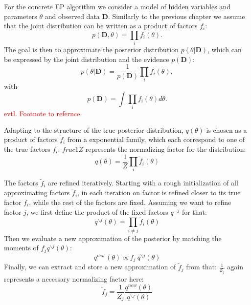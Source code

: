 \documentclass{sigkdd}
\begin{document}
For the concrete EP algorithm we consider a model of hidden variables and parameters $\theta$ and observed data $\mathbf{D}$. Similarly to the previous chapter we assume that the joint distribution can be written as a product of factors $f_i$:
\begin{equation}\label{eq:ep3}
p(\mathbf{D}, \theta) = \prod_i f_i(\theta).
\end{equation}
The goal is then to approximate the posterior distribution $p(\theta|\mathbf{D})$, which can be expressed by the joint distribution and the evidence $p(\mathbf{D})$:
\begin{equation}\label{eq:ep4}
p(\theta|\mathbf{D}) = \frac{1}{p(\mathbf{D})} \prod_i f_i(\theta),
\end{equation}
with 
\begin{equation}\label{eq:ep5}
p(\mathbf{D}) = \int \prod_i f_i(\theta) d\theta.
\end{equation}
\textcolor{red}{evtl. Footnote to refernce}.  

Adapting to the structure of the true posterior distribution, $q(\theta)$ is chosen as a product of factors $\tilde{f}_i$ from a exponential family, which each correspond to one of the true factors $f_i$: $frac{1}{Z}$ represents the normalizing factor for the distribution:
\begin{equation}\label{eq:ep6}
q(\theta) = \frac{1}{Z}\prod_i \tilde{f}_i(\theta)
\end{equation}

The factors $\tilde{f}_i$ are refined iteratively. Starting with a rough initialization of all approximating factors $\tilde{f}_i$, in each iteration on factor is refined closer to its true factor $f_i$, while the rest of the factors are fixed. Assuming we want to refine factor $j$, we first define the product of the fixed factors $q^{-j}$ for that:
\begin{equation}\label{eq:ep7}
q^{\backslash j}(\theta) = \prod_{i\ne j} \tilde{f}_i(\theta)
\end{equation}
Then we evaluate a new approximation of the posterior by matching the moments of $f_j q^{\backslash j}(\theta)$:
\begin{equation}\label{eq:ep7}
q^{new}(\theta) \propto f_j ~ q^{\backslash j}(\theta)
\end{equation}
Finally, we can extract and store a new approximation of $\tilde{f}_j$ from that: $\frac{1}{Z_j}$ again represents a necessary normalizing factor here:
\begin{equation}\label{eq:ep8}
\tilde{f}_j = \frac{1}{Z_j} \frac{q^{new}(\theta)}{q^{\backslash j}(\theta)}
\end{equation}
\end{document}
